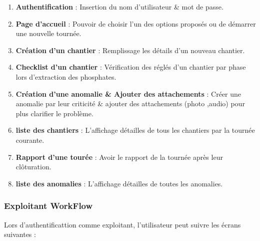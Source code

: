 \begin{enumerate}
\item \textbf{Authentification} : Insertion du nom d'utilisateur \& mot de passe.

\item \textbf{Page d'accueil} : Pouvoir de choisir l'un des options propos\'es ou de d\'emarrer une nouvelle tourn\'ee. 

\item \textbf{Cr\'eation d'un chantier} : Remplissage les d\'etails d'un nouveau chantier.

\item \textbf{Checklist d'un chantier} : V\'erification des r\'egl\'es d'un chantier par phase lors d'extraction des phosphates.

\item \textbf{Cr\'eation d'une anomalie \& Ajouter des attachements} : Cr\'eer une anomalie par leur criticit\'e \& ajouter des attachements (photo ,audio) pour plus clarifier le probl\`eme.

\item \textbf{liste des chantiers} : L'affichage d\'etailles de tous les chantiers par la tourn\'ee courante.

\item \textbf{Rapport d'une tour\'ee} : Avoir le rapport de la tourn\'ee apr\`es leur cl\^oturation.

\item \textbf{liste des anomalies} : L'affichage d\'etailles de toutes les anomalies.
\end{enumerate}

\subsubsection{Exploitant WorkFlow}

Lors d'authentificattion comme exploitant, l'utilisateur peut suivre les \'ecrans suivantes :

